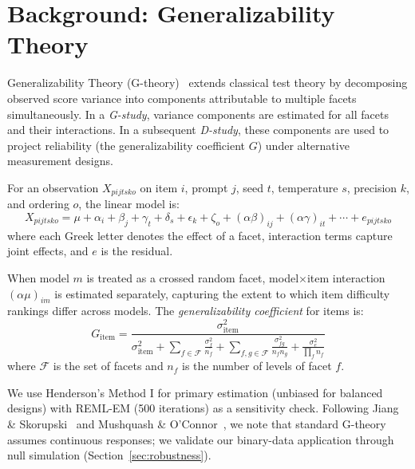 \documentclass[11pt,a4paper]{article}
\newcommand{\Gcoeff}{\ensuremath{G}}
\begin{document}
\section{Background: Generalizability Theory}

Generalizability Theory (G-theory)~\citep{shavelson1991,brennan2001} extends classical test theory by decomposing observed score variance into components attributable to multiple facets simultaneously.
In a \emph{G-study}, variance components are estimated for all facets and their interactions.
In a subsequent \emph{D-study}, these components are used to project reliability (the generalizability coefficient $\Gcoeff$) under alternative measurement designs.

For an observation $X_{pijtsko}$ on item $i$, prompt $j$, seed $t$, temperature $s$, precision $k$, and ordering $o$, the linear model is:
\begin{equation}
X_{pijtsko} = \mu + \alpha_i + \beta_j + \gamma_t + \delta_s + \epsilon_k + \zeta_o + (\alpha\beta)_{ij} + (\alpha\gamma)_{it} + \cdots + e_{pijtsko}
\label{eq:gmodel}
\end{equation}
where each Greek letter denotes the effect of a facet, interaction terms capture joint effects, and $e$ is the residual.

When model $m$ is treated as a crossed random facet, model$\times$item interaction $(\alpha\mu)_{im}$ is estimated separately, capturing the extent to which item difficulty rankings differ across models.
The \emph{generalizability coefficient} for items is:
\begin{equation}
\Gcoeff_\text{item} = \frac{\sigma^2_\text{item}}{\sigma^2_\text{item} + \sum_{f \in \mathcal{F}} \frac{\sigma^2_{f}}{n_f} + \sum_{f,g \in \mathcal{F}} \frac{\sigma^2_{fg}}{n_f n_g} + \frac{\sigma^2_e}{\prod_{f} n_f}}
\label{eq:gcoeff}
\end{equation}
where $\mathcal{F}$ is the set of facets and $n_f$ is the number of levels of facet $f$.

We use Henderson's Method I for primary estimation (unbiased for balanced designs) with REML-EM (500 iterations) as a sensitivity check.
Following Jiang \& Skorupski~\citeyearpar{jiang2017} and Mushquash \& O'Connor~\citeyearpar{mushquash2006}, we note that standard G-theory assumes continuous responses; we validate our binary-data application through null simulation (Section~\ref{sec:robustness}).
\end{document}
